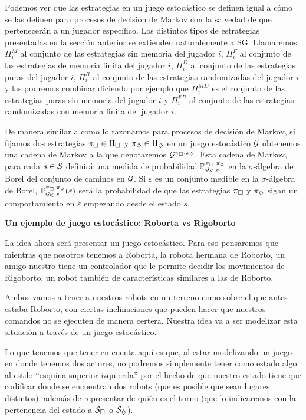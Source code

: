 Podemos ver que las estrategias en un juego estocástico se definen igual a cómo
se las definen para procesos de decisión de Markov con la salvedad de que
pertenecerán a un jugador específico. Los distintos tipos de estrategias
presentadas en la sección anterior se extienden naturalemente a SG. Llamaremos
$\Pi^{M}_i$ al conjunto de las estrategias sin memoria del jugador $i$,
$\Pi^{F}_i$ al conjunto de las estrategias de memoria finita del jugador $i$,
$\Pi^{D}_i$ al conjunto de las estrategias puras del jugador $i$, $\Pi^{R}_i$
al conjunto de las estrategias randomizadas del jugador $i$ y las podremos
combinar diciendo por ejemplo que $\Pi^{MD}_i$ es el conjunto de las
estrategias puras sin memoria del jugador $i$ y $\Pi^{FR}_i$ al conjunto de las
estrategias randomizadas con memoria finita del jugador $i$.

De manera similar a como lo razonamos para procesos de decisión de Markov, si
fijamos dos estrategias $\pi_\square \in \Pi_\square$ y $\pi_\diamondsuit \in \Pi_\diamondsuit$
en un juego estocástico $\mathcal{G}$ obtenemos una cadena de Markov a la que
denotaremos $\mathcal{G}^{\pi_\square, \pi_\diamondsuit}$. Esta cadena de Markov, para cada $s \in
	\mathcal{S}$ definirá una medida de probabilidad $\mathbb{P}_{\mathcal{G}_{\mathcal{K}}, s}^{\pi_\square, \pi_\diamondsuit}$ en la $\sigma$-álgebra de
Borel del conjunto de caminos en $\mathcal{G}$. Si $\varepsilon$ es un conjunto medible
en la $\sigma$-álgebra de Borel, $\mathbb{P}_{\mathcal{G}_{\mathcal{K}}, s}^{\pi_\square, \pi_\diamondsuit}(\varepsilon)$ será la probabilidad de
que las estrategias $\pi_\square$ y $\pi_\diamondsuit$ sigan un comportamiento en
$\varepsilon$ empezando desde el estado $s$.

\textbf{Un ejemplo de juego estocástico: Roborta vs Rigoborto}

La idea ahora será presentar un juego estocástico. Para eso pensaremos que
mientras que nosotros tenemos a Roborta, la robota hermana de Roborto, un amigo
nuestro tiene un controlador que le permite decidir los movimientos de
Rigoborto, un robot también de características similares a las de Roborto.

Ambos vamos a tener a nuestros robots en un terreno como sobre el que antes
estaba Roborto, con ciertas inclinaciones que pueden hacer que nuestros
comandos no se ejecuten de manera certera. Nuestra idea va a ser modelizar esta
situación a través de un juego estocástico.

Lo que tenemos que tener en cuenta aquí es que, al estar modelizando un juego
en donde tenemos dos actores, no podremos simplemente tener como estado algo al
estilo ``esquina superior izquierda'' por el hecho de que nuestro estado tiene
que codificar donde se encuentran dos robots (que es posible que sean lugares
distintos), además de representar de quién es el turno (que lo indicaremos con
la pertenencia del estado a $\mathcal{S}_\square$ o $\mathcal{S}_\diamondsuit$).

